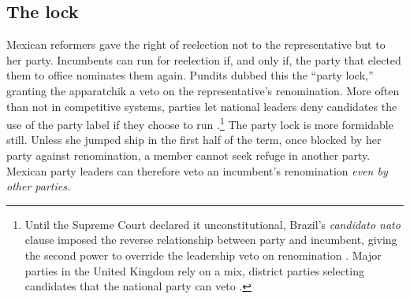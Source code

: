 \documentclass[letter,12pt]{article}
\begin{document}
\subsection{The lock}


Mexican reformers gave the right of reelection not to the representative but to her party. Incumbents can run for reelection if, and only if, the party that elected them to office nominates them again. Pundits dubbed this the ``party lock,'' granting the apparatchik a veto on the representative's renomination. More often than not in competitive systems, parties let national leaders deny candidates the use of the party label if they choose to run \citep[:85]{ranney.cand-sel.1981}.\footnote{Until the Supreme Court declared it unconstitutional, Brazil's \emph{candidato nato} clause imposed the reverse relationship between party and incumbent, giving the second power to override the leadership veto on renomination \citep{mainwaring.1991}. Major parties in the United Kingdom rely on a mix, district parties selecting candidates that the national party can veto \citep{mikulska.uk.cand.sel2010}.} The party lock is more formidable still. Unless she jumped ship in the first half of the term, once blocked by her party against renomination, a member cannot seek refuge in another party. Mexican party leaders can therefore veto an incumbent's renomination \emph{even by other parties}. 
\end{document}
